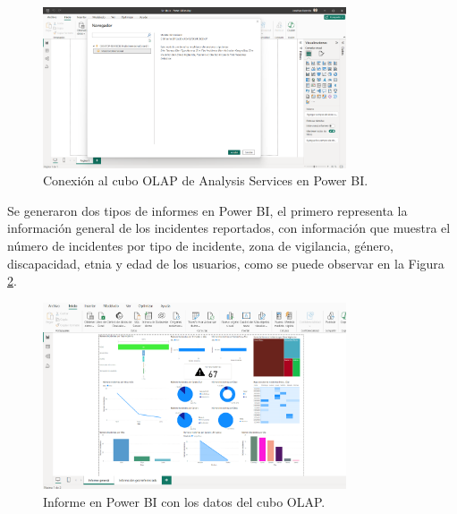\begin{figure}[H]
    \centering
    \includegraphics[width=0.8\textwidth]{chapters/III-resultados-y-discusion/resources/images/conexion-bi.png}
    \caption{Conexión al cubo OLAP de Analysis Services en Power BI.}
    \label{fig:conexion-bi}
\end{figure}



Se generaron dos tipos de informes en Power BI, el primero representa la información general de los incidentes reportados, con información
que muestra el número de incidentes por tipo de incidente, zona de vigilancia, género, discapacidad, etnia y edad de los usuarios, como se
puede observar en la Figura \ref{fig:informe-bi}.

\begin{figure}[H]
    \centering
    \includegraphics[width=0.8\textwidth]{chapters/III-resultados-y-discusion/resources/images/informe-bi.png}
    \caption{Informe en Power BI con los datos del cubo OLAP.}
    \label{fig:informe-bi}
\end{figure}


